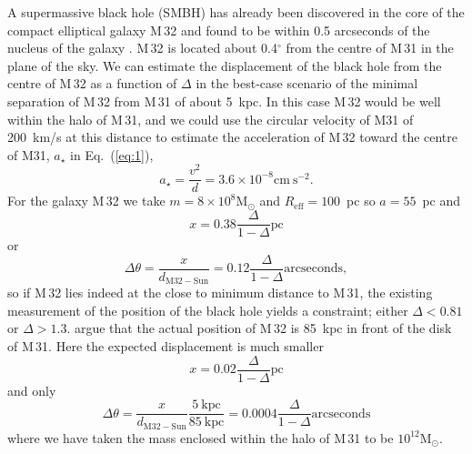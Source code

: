 \documentclass[useAMS,usenatbib]{mn2e}
\newcommand{\msun}{\mathrm{M}_\odot}
\begin{document}
A supermassive black hole (SMBH) has already been discovered in the
core of the compact elliptical galaxy M\,32
\citep{1997Natur.385..610V} and found to be within 0.5 arcseconds of
the nucleus of the galaxy \citep{2015arXiv150203231Y}.  M\,32 is
located about 0.4$^\circ$ from the centre of M\,31 in the plane of the
sky.  We can estimate the displacement of the black hole from the
centre of M\,32 as a function of $\Delta$ in the best-case scenario of
the minimal separation of M\,32 from M\,31 of about 5~kpc.  In this
case M\,32 would be well within the halo of M\,31, and we could use
the circular velocity of M31 of 200~km/s at this distance to estimate
the acceleration of M\,32 toward the centre of M31, $a_\star$ in
Eq.~(\ref{eq:1}),
\begin{equation}
  a_\star = \frac{v^2}{d} = 3.6\times 10^{-8} \mathrm{cm~s}^{-2}
  \label{eq:7}.
\end{equation}
For the galaxy M\,32 we take $m=8 \times 10^8 \msun$ and
$R_\mathrm{eff} = 100$~pc so $a=55$~pc and
\begin{equation}
  x = 0.38 \frac{\Delta}{1-\Delta} \mathrm{pc}
  \label{eq:8}
\end{equation}
or
\begin{equation}
  \Delta \theta = \frac{x}{d_\mathrm{M32-Sun}} = 0.12 \frac{\Delta}{1-\Delta} \mathrm{arcseconds},
  \label{eq:9}
\end{equation}
so if M\,32 lies indeed at the close to minimum distance to M\,31, the
existing measurement of the position of the black hole yields a
constraint; either $\Delta < 0.81$ or $\Delta>1.3$.
\citet{2014ApJ...788L..38D} argue that the actual
position of M\,32 is 85~kpc in front of the disk of M\,31.  Here the
expected displacement is much smaller
\begin{equation}
  x = 0.02 \frac{\Delta}{1-\Delta} \mathrm{pc}
  \label{eq:10}
\end{equation}
and only
\begin{equation} 
  \Delta \theta = \frac{x}{d_\mathrm{M32-Sun}}
  \frac{5~\mathrm{kpc}}{85~\mathrm{kpc}} = 0.0004
  \frac{\Delta}{1-\Delta} \mathrm{arcseconds}
  \label{eq:11}
\end{equation}
where we have taken the mass enclosed within the halo of M\,31 to
be $10^{12} \msun$.
\end{document}

